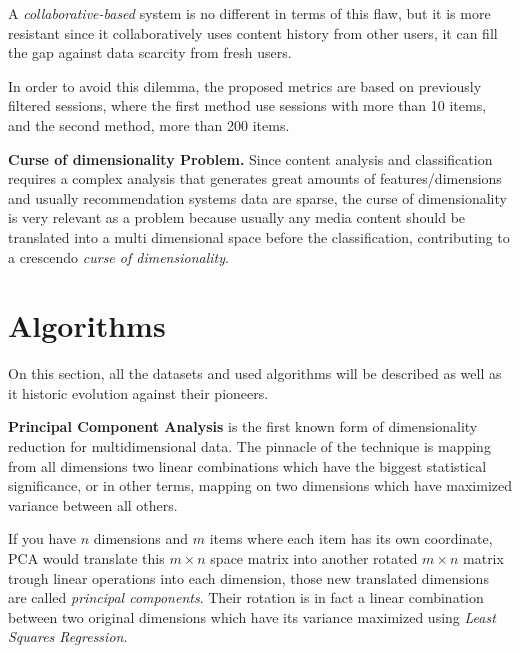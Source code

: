 \documentclass[ecp,tc,english]{iiufrgs}
\begin{document}
        A \textit{collaborative-based} system is no different in terms of this flaw, but it is more resistant since it collaboratively uses content history from other users, it can fill the gap against data scarcity from fresh users.
        
        In order to avoid this dilemma, the proposed metrics are based on previously filtered sessions, where the first method use sessions with more than 10 items, and the second method, more than 200 items.
    
        \textbf{Curse of dimensionality Problem.} Since content analysis and classification requires a complex analysis that generates great amounts of features/dimensions and usually recommendation systems data are sparse, the curse of dimensionality \cite{10.1093/imamat/24.1.59} is very relevant as a problem because usually any media content should be translated into a multi dimensional space before the classification, contributing to a crescendo \textit{curse of dimensionality}.

        
    \section{Algorithms} \label{algorithms}
    
    On this section, all the datasets and used algorithms will be described as well as it historic evolution against their pioneers.
        
    \textbf{Principal Component Analysis} \cite{hotelling:33}  is the first known form of dimensionality reduction for multidimensional data. The pinnacle of the technique is mapping from all dimensions two linear combinations which have the biggest statistical significance, or in other terms, mapping on two dimensions which have maximized variance between all others.
    
    If you have \(n\) dimensions and \(m\) items where each item has its own coordinate, PCA would translate this \(m \times n\) space matrix into another rotated \(m \times n\) matrix trough linear operations into each dimension, those new translated dimensions are called \textit{principal components}.
    Their rotation is in fact a linear combination between two original dimensions which have its variance maximized using \textit{Least Squares Regression}.
    
\end{document}

